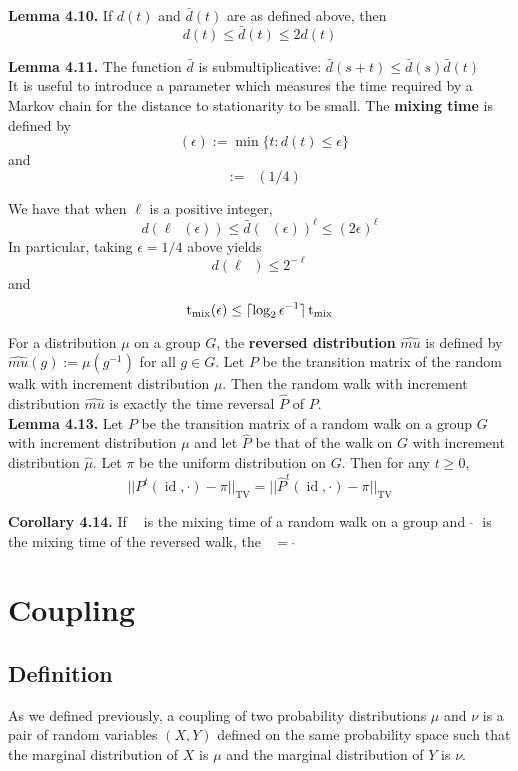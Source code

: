 \documentclass[12pt]{article}
\DeclareMathOperator*{\TV}{\text{TV}}
\DeclareMathOperator*{\id}{\text{id}}
\DeclareMathOperator*{\mix}{t_{\text{mix}}}
\DeclarePairedDelimiter{\ceil}{\lceil}{\rceil}
\begin{document}
\textbf{Lemma 4.10.} If $d(t)$ and $\bar{d}(t)$ are as defined above, then $$d(t) \leq \bar{d}(t) \leq 2d(t)$$ 

\textbf{Lemma 4.11.} The function $\bar{d}$ is submultiplicative: $\bar{d}(s+t) \leq \bar{d}(s)\bar{d}(t)$\\

It is useful to introduce a parameter which measures the time required by a Markov chain for the distance to stationarity to be small. The \textbf{mixing time} is defined by $$\mix (\epsilon) := \min \{t : d(t) \leq \epsilon\}$$ and $$\mix := \mix(1/4)$$

We have that when $\ell$ is a positive integer, $$d(\ell \mix(\epsilon)) \leq \bar{d}(\mix(\epsilon))^{\ell} \leq (2 \epsilon)^{\ell}$$ In particular, taking $\epsilon = 1/4$ above yields $$d(\ell \mix) \leq 2^{-\ell}$$ and $$\mix(\epsilon) \leq \ceil{\log_2 \epsilon^{-1}}\mix$$

For a distribution $\mu$ on a group $G$, the \textbf{reversed distribution} $\hat{mu}$ is defined by $\hat{mu}(g) := \mu(g^{-1})$ for all $g \in G$. Let $P$ be the transition matrix of the random walk with increment distribution $\mu$. Then the random walk with increment distribution $\hat{mu}$ is exactly the time reversal $\hat{P}$ of $P$.\\

\textbf{Lemma 4.13.} Let $P$ be the transition matrix of a random walk on a group $G$ with increment distribution $\mu$ and let $\hat{P}$ be that of the walk on $G$ with increment distribution $\hat{\mu}$. Let $\pi$ be the uniform distribution on $G$. Then for any $t \geq 0$, $$||P^t(\id, \cdot) - \pi||_{\TV} = ||\hat{P}^t(\id, \cdot) - \pi||_{\TV}$$

\textbf{Corollary 4.14.} If $\mix$ is the mixing time of a random walk on a group and $\widehat{\mix}$ is the mixing time of the reversed walk, the $\mix = \widehat{\mix}$


\section{Coupling}

\subsection{Definition}

As we defined previously, a coupling of two probability distributions $\mu$ and $\nu$ is a pair of random variables $(X, Y)$ defined on the same probability space such that the marginal distribution of $X$ is $\mu$ and the marginal distribution of $Y$ is $\nu$.\\
\end{document}
